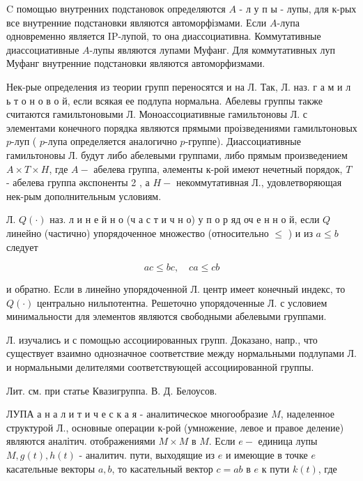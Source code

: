 \documentclass[10pt]{article}
\begin{document}
C помощью внутренних подстановок определяются $A$ - л у п ы - лупы, для к-рых все внутренние подстановки являются автоморфізмами. Если $A$-лупа одновременно является IP-лупой, то она диассоциативна. Коммутативные диассоциативные $A$-лупы являются лупами Муфанг. Для коммутативных луп Муфанг внутренние подстановки являются автоморфизмами.



Нек-рые определения из теории групп переносятся и на Л. Так, Л. наз. г а м и л ь т о н о в о й, если всякая ее подлупа нормальна. Абелевы группы также считаются гамильтоновыми Л. Моноассоциативные гамильтоновы Л. с элементами конечного порядка являются прямыми проізведениями гамильтоновых $p$-луп ( $p$-лупа определяется аналогично $p$-группе). Диассоциативные гамильтоновы Л. будут либо абелевыми группами, либо прямым произведением $A \times T \times H$, где $A-$ абелева группа, әлементы к-рой имеют нечетный порядок, $T$ - абелева группа әкспоненты 2 , а $H-$ некоммутативная Л., удовлетворяющая нек-рым дополнительным условиям.



Л. $Q(\cdot)$ наз. л и н е й н о (ч а с т и ч н о) у п о р яд оч е н н о й, если $Q$ линейно (частично) упорядоченное множество (относительно $\leqslant$ ) и из $a \leqslant b$ следует



\[

a c \leqslant b c, \quad c a \leqslant c b

\]



и обратно. Если в линейно упорядоченной Л. центр имеет конечный индекс, то $Q(\cdot)$ центрально нильпотентна. Решеточно упорядоченные Л. с условием минимальности для элементов являются свободными абелевыми группами.



Л. изучались и с помощью ассоциированных групп. Доказано, напр., что существует взаимно однозначное соответствие между нормальными подлупами Л. и нормальными делителями соответствующей ассоциированной группы.



Лит. см. при статье Квазигруппа. В. Д. Белоусов.



ЛУПА а н а л и т и ч е с к а я - аналитическое многообразие $M$, наделенное структурой Л., основные операции к-рой (умножение, левое и правое деление) являются аналітич. отображениями $M \times M$ в $M$. Если $e-$ единица лупы $M, g(t), h(t)$ - аналитич. пути, выходящие из $e$ и имеющие в точке $e$ касательные векторы $a, b$, то касательный вектор $c=a b$ в $e$ к пути $k(t)$, где
\end{document}
